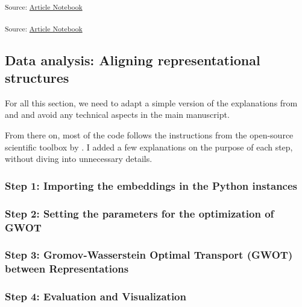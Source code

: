 \documentclass[
  authoryear]{elsarticle}
\begin{document}
\textsubscript{Source:
\href{https://m-delem.github.io/2499-similarity-manuscript/index.qmd.html}{Article
Notebook}}

\textsubscript{Source:
\href{https://m-delem.github.io/2499-similarity-manuscript/index.qmd.html}{Article
Notebook}}

\subsection{Data analysis: Aligning representational
structures}\label{data-analysis-aligning-representational-structures}

For all this section, we need to adapt a simple version of the
explanations from \citet{kawakita2023} and
\citet{sasakiToolboxGromovWassersteinOptimal2023} and avoid any
technical aspects in the main manuscript.

From there on, most of the code follows the instructions from the
open-source scientific toolbox by
\citet{sasakiToolboxGromovWassersteinOptimal2023}. I added a few
explanations on the purpose of each step, without diving into
unnecessary details.

\subsubsection*{Step 1: Importing the embeddings in the Python
instances}\label{step-1-importing-the-embeddings-in-the-python-instances}

\subsubsection*{Step 2: Setting the parameters for the optimization of
GWOT}\label{step-2-setting-the-parameters-for-the-optimization-of-gwot}

\subsubsection*{Step 3: Gromov-Wasserstein Optimal Transport (GWOT)
between
Representations}\label{step-3-gromov-wasserstein-optimal-transport-gwot-between-representations}

\subsubsection{Step 4: Evaluation and
Visualization}\label{step-4-evaluation-and-visualization}
\end{document}
